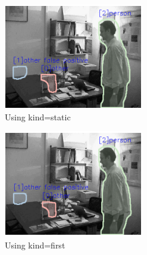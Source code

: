 \documentclass{article}
\begin{document}
\begin{figure}
    \begin{subfigure}{0.3\textwidth}
        \includegraphics[width=\linewidth,keepaspectratio]{out481_static.PNG}
        \caption{Using kind=static}
    \end{subfigure}
    \begin{subfigure}{0.3\textwidth}
        \includegraphics[width=\linewidth,keepaspectratio]{out481_first.PNG}
        \caption{Using kind=first}
    \end{subfigure}
    \begin{subfigure}{0.3\textwidth}

\end{subfigure}
\end{figure}
\end{document}
